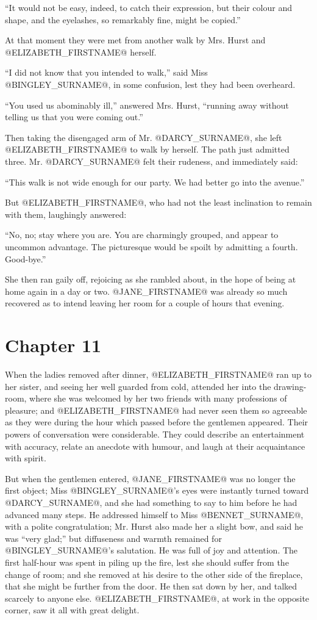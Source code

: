``It would not be easy, indeed, to catch their expression, but their
colour and shape, and the eyelashes, so remarkably fine, might be
copied.''

At that moment they were met from another walk by Mrs. Hurst and
@ELIZABETH_FIRSTNAME@ herself.

``I did not know that you intended to walk,'' said Miss @BINGLEY_SURNAME@, in some
confusion, lest they had been overheard.

``You used us abominably ill,'' answered Mrs. Hurst, ``running away without
telling us that you were coming out.''

Then taking the disengaged arm of Mr. @DARCY_SURNAME@, she left @ELIZABETH_FIRSTNAME@ to walk
by herself. The path just admitted three. Mr. @DARCY_SURNAME@ felt their rudeness,
and immediately said:

``This walk is not wide enough for our party. We had better go into the
avenue.''

But @ELIZABETH_FIRSTNAME@, who had not the least inclination to remain with them,
laughingly answered:

``No, no; stay where you are. You are charmingly grouped, and appear
to uncommon advantage. The picturesque would be spoilt by admitting a
fourth. Good-bye.''

She then ran gaily off, rejoicing as she rambled about, in the hope of
being at home again in a day or two. @JANE_FIRSTNAME@ was already so much recovered
as to intend leaving her room for a couple of hours that evening.



\chapter*{Chapter 11}


When the ladies removed after dinner, @ELIZABETH_FIRSTNAME@ ran up to her
sister, and seeing her well guarded from cold, attended her into the
drawing-room, where she was welcomed by her two friends with many
professions of pleasure; and @ELIZABETH_FIRSTNAME@ had never seen them so agreeable
as they were during the hour which passed before the gentlemen appeared.
Their powers of conversation were considerable. They could describe an
entertainment with accuracy, relate an anecdote with humour, and laugh
at their acquaintance with spirit.

But when the gentlemen entered, @JANE_FIRSTNAME@ was no longer the first object;
Miss @BINGLEY_SURNAME@'s eyes were instantly turned toward @DARCY_SURNAME@, and she had
something to say to him before he had advanced many steps. He addressed
himself to Miss @BENNET_SURNAME@, with a polite congratulation; Mr. Hurst also
made her a slight bow, and said he was ``very glad;'' but diffuseness
and warmth remained for @BINGLEY_SURNAME@'s salutation. He was full of joy and
attention. The first half-hour was spent in piling up the fire, lest she
should suffer from the change of room; and she removed at his desire
to the other side of the fireplace, that she might be further from
the door. He then sat down by her, and talked scarcely to anyone
else. @ELIZABETH_FIRSTNAME@, at work in the opposite corner, saw it all with great
delight.

